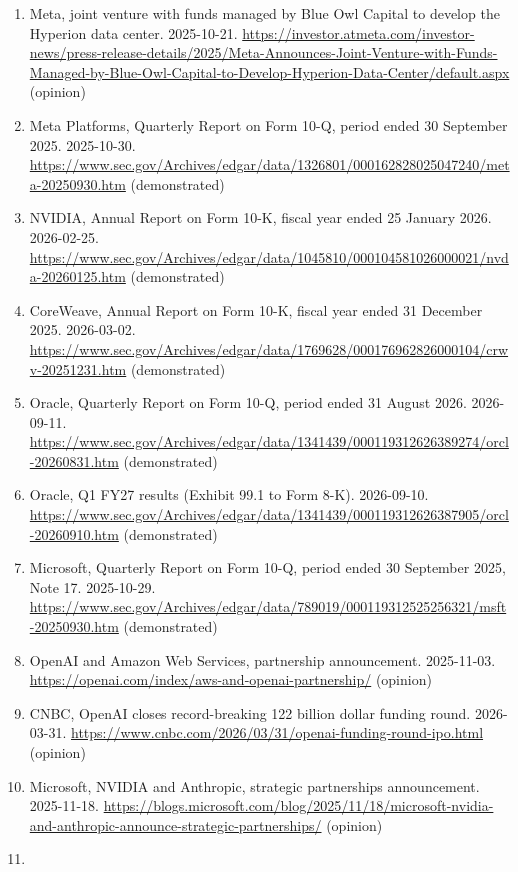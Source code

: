 \documentclass[10pt,letterpaper]{article}
\providecommand{\tightlist}{\setlength{\itemsep}{1pt}\setlength{\parskip}{0pt}}
\begin{document}
\begin{enumerate}
\def\labelenumi{\arabic{enumi}.}
\tightlist
\item
  Meta, joint venture with funds managed by Blue Owl Capital to develop
  the Hyperion data center. 2025-10-21.
  \url{https://investor.atmeta.com/investor-news/press-release-details/2025/Meta-Announces-Joint-Venture-with-Funds-Managed-by-Blue-Owl-Capital-to-Develop-Hyperion-Data-Center/default.aspx}
  (opinion)
\item
  Meta Platforms, Quarterly Report on Form 10-Q, period ended 30
  September 2025. 2025-10-30.
  \url{https://www.sec.gov/Archives/edgar/data/1326801/000162828025047240/meta-20250930.htm}
  (demonstrated)
\item
  NVIDIA, Annual Report on Form 10-K, fiscal year ended 25 January 2026.
  2026-02-25.
  \url{https://www.sec.gov/Archives/edgar/data/1045810/000104581026000021/nvda-20260125.htm}
  (demonstrated)
\item
  CoreWeave, Annual Report on Form 10-K, fiscal year ended 31 December
  2025. 2026-03-02.
  \url{https://www.sec.gov/Archives/edgar/data/1769628/000176962826000104/crwv-20251231.htm}
  (demonstrated)
\item
  Oracle, Quarterly Report on Form 10-Q, period ended 31 August 2026.
  2026-09-11.
  \url{https://www.sec.gov/Archives/edgar/data/1341439/000119312626389274/orcl-20260831.htm}
  (demonstrated)
\item
  Oracle, Q1 FY27 results (Exhibit 99.1 to Form 8-K). 2026-09-10.
  \url{https://www.sec.gov/Archives/edgar/data/1341439/000119312626387905/orcl-20260910.htm}
  (demonstrated)
\item
  Microsoft, Quarterly Report on Form 10-Q, period ended 30 September
  2025, Note 17. 2025-10-29.
  \url{https://www.sec.gov/Archives/edgar/data/789019/000119312525256321/msft-20250930.htm}
  (demonstrated)
\item
  OpenAI and Amazon Web Services, partnership announcement. 2025-11-03.
  \url{https://openai.com/index/aws-and-openai-partnership/} (opinion)
\item
  CNBC, OpenAI closes record-breaking 122 billion dollar funding round.
  2026-03-31.
  \url{https://www.cnbc.com/2026/03/31/openai-funding-round-ipo.html}
  (opinion)
\item
  Microsoft, NVIDIA and Anthropic, strategic partnerships announcement.
  2025-11-18.
  \url{https://blogs.microsoft.com/blog/2025/11/18/microsoft-nvidia-and-anthropic-announce-strategic-partnerships/}
  (opinion)
\item

\end{enumerate}
\end{document}
